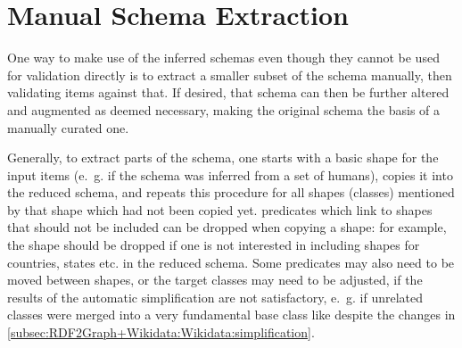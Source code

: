 \section{Manual Schema Extraction}
\label{sec:Evaluation:extraction}

One way to make use of the inferred \glspl{schema}
even though they cannot be used for validation directly
is to extract a smaller subset of the \gls{schema} manually,
then validating \glspl{item} against that.
If desired, that \gls{schema} can then be further altered and augmented as deemed necessary,
making the original \gls{schema} the basis of a manually curated one.

Generally, to extract parts of the \gls{schema},
one starts with a basic \gls{shape} for the input \glspl{item}
(e.~g.  if the \gls{schema} was inferred from a set of humans),
copies it into the reduced \gls{schema},
and repeats this procedure for all \glspl{shape} (classes) mentioned by that \gls{shape} which had not been copied yet.
\Glspl{predicate} which link to \glspl{shape} that should not be included can be dropped when copying a \gls{shape}:
for example, the  \gls{shape} should be dropped
if one is not interested in including \glspl{shape} for countries, states etc. in the reduced \gls{schema}.
Some \glspl{predicate} may also need to be moved between \glspl{shape},
or the target classes may need to be adjusted,
if the results of the automatic simplification are not satisfactory,
e.~g. if unrelated classes were merged into a very fundamental base class like 
despite the changes in \cref{subsec:RDF2Graph+Wikidata:Wikidata:simplification}.

